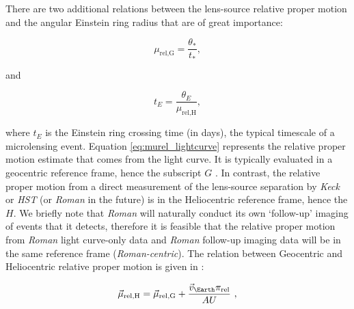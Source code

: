 \documentclass[twocolumn]{aastex631}
\begin{document}
\indent There are two additional relations between the lens-source relative proper motion and the angular Einstein ring radius that are of great importance:

\begin{equation}\label{eq:murel_lightcurve}
    \mu_{\textrm{rel,G}} = \frac{\theta_*}{t_*},
\end{equation}

\noindent and

\begin{equation}\label{eq:murel_imaging}
    t_E = \frac{\theta_E}{\mu_{\textrm{rel,H}}},
\end{equation}

\noindent where $t_E$ is the Einstein ring crossing time (in days), the typical timescale of a microlensing event. Equation \ref{eq:murel_lightcurve} represents the relative proper motion estimate that comes from the light curve. It is typically evaluated in a geocentric reference frame, hence the subscript $G$ \citep{gould:2004a}. In contrast, the relative proper motion from a direct measurement of the lens-source separation by \textit{Keck} or \textit{HST} (or \textit{Roman} in the future) is in the Heliocentric reference frame, hence the $H$. We briefly note that \textit{Roman} will naturally conduct its own `follow-up' imaging of events that it detects, therefore it is feasible that the relative proper motion from \textit{Roman} light curve-only data and \textit{Roman} follow-up imaging data will be in the same reference frame (\textit{Roman-centric}). The relation between Geocentric and Heliocentric relative proper motion is given in \cite{dong:2009b}:

\begin{equation}\label{eq:mu-rel}
\vec{\mu}_{\textrm{rel,H}} = \vec{\mu}_{\textrm{rel,G}} + \frac{{\vec{v}_{\Earth}}{\pi_{\textrm{rel}}}}{AU} \ ,
\end{equation}
\end{document}
